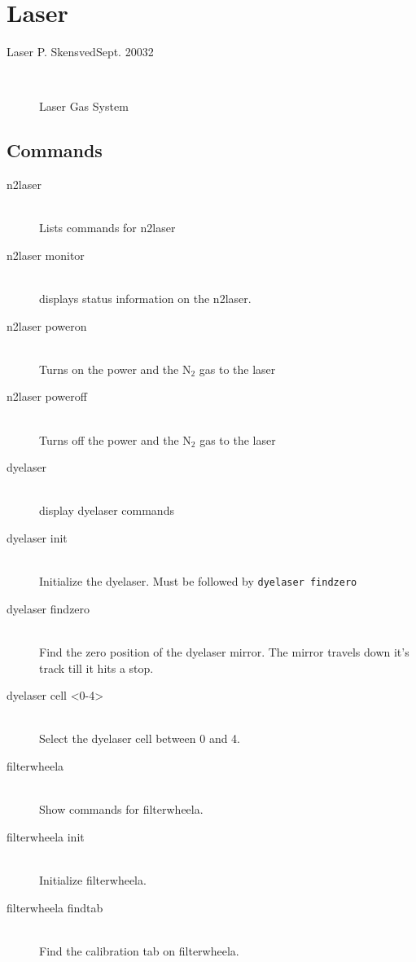 \chapter{Laser}

       {Laser}
      {P. Skensved}{Sept. 2003}{2}

  
   
\begin{figure}[htb]
\begin{center}
\leavevmode
\epsfxsize=7in
~\\
\caption[Laser Gas System]
        {Laser Gas System
        }
\end{center}
\end{figure}
  
\section{Commands}
\begin{description}
\item[n2laser]~\\
  Lists commands for n2laser
\item[n2laser monitor]~\\
  displays status information on the n2laser.
\item[n2laser poweron]~\\
  Turns on the power and the N$_2$ gas to the laser
\item[n2laser poweroff]~\\
  Turns off the power and the N$_2$ gas to the laser
\item[dyelaser]~\\
  display dyelaser commands
\item[dyelaser init]~\\
  Initialize the dyelaser.  Must be followed by {\tt dyelaser findzero}
\item[dyelaser findzero]~\\
  Find the zero position of the dyelaser mirror.  The mirror
  travels down it's track till it hits a stop.
\item[dyelaser cell <0-4>]~\\
  Select the dyelaser cell between 0 and 4.
\item[filterwheela]~\\
  Show commands for filterwheela.
\item[filterwheela init]~\\
  Initialize filterwheela.
\item[filterwheela findtab]~\\
  Find the calibration tab on filterwheela.
\end{description}
  
